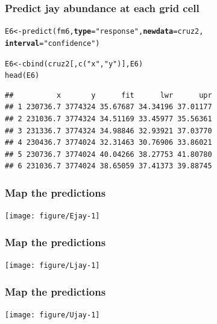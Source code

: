 \documentclass[color=usenames,dvipsnames]{beamer}\usepackage[]{graphicx}\usepackage[]{color}
\makeatletter
\newcommand{\hlstr}[1]{\textcolor[rgb]{0.749,0.012,0.012}{#1}}%
\newcommand{\hlstd}[1]{\textcolor[rgb]{0,0,0}{#1}}%
\newcommand{\hlkwb}[1]{\textcolor[rgb]{0,0.341,0.682}{#1}}%
\newcommand{\hlkwc}[1]{\textcolor[rgb]{0,0,0}{\textbf{#1}}}%
\newcommand{\hlkwd}[1]{\textcolor[rgb]{0.004,0.004,0.506}{#1}}%
\newenvironment{kframe}{%
 \def\at@end@of@kframe{}%
 \ifinner\ifhmode%
  \def\at@end@of@kframe{\end{minipage}}%
  \begin{minipage}{\columnwidth}%
 \fi\fi%
 \def\FrameCommand##1{\hskip\@totalleftmargin \hskip-\fboxsep
 \colorbox{shadecolor}{##1}\hskip-\fboxsep
     \hskip-\linewidth \hskip-\@totalleftmargin \hskip\columnwidth}%
 \MakeFramed {\advance\hsize-\width
   \@totalleftmargin\z@ \linewidth\hsize
   \@setminipage}}%
 {\par\unskip\endMakeFramed%
 \at@end@of@kframe}
\newenvironment{knitrout}{}{} %
\makeatother
\begin{document}
\begin{frame}[fragile]
  \frametitle{Predict jay abundance at each grid cell}
\begin{knitrout}
\color{fgcolor}\begin{kframe}
\begin{alltt}
\hlstd{E6} \hlkwb{<-} \hlkwd{predict}\hlstd{(fm6,} \hlkwc{type}\hlstd{=}\hlstr{"response"}\hlstd{,} \hlkwc{newdata}\hlstd{=cruz2,}
              \hlkwc{interval}\hlstd{=}\hlstr{"confidence"}\hlstd{)}
\end{alltt}
\end{kframe}
\end{knitrout}
\pause
\begin{knitrout}
\color{fgcolor}\begin{kframe}
\begin{alltt}
\hlstd{E6} \hlkwb{<-} \hlkwd{cbind}\hlstd{(cruz2[,}\hlkwd{c}\hlstd{(}\hlstr{"x"}\hlstd{,}\hlstr{"y"}\hlstd{)], E6)}
\hlkwd{head}\hlstd{(E6)}
\end{alltt}
\begin{verbatim}
##          x       y      fit      lwr      upr
## 1 230736.7 3774324 35.67687 34.34196 37.01177
## 2 231036.7 3774324 34.51169 33.45977 35.56361
## 3 231336.7 3774324 34.98846 32.93921 37.03770
## 4 230436.7 3774024 32.31463 30.76906 33.86021
## 5 230736.7 3774024 40.04266 38.27753 41.80780
## 6 231036.7 3774024 38.65059 37.41373 39.88745
\end{verbatim}
\end{kframe}
\end{knitrout}
\end{frame}


\begin{frame}[fragile]
  \frametitle{Map the predictions}
  \scriptsize

\texttt{[image: figure/Ejay-1]}
\end{frame}




\begin{frame}[fragile]
  \frametitle{Map the predictions}
  \scriptsize

\texttt{[image: figure/Ljay-1]}
\end{frame}




\begin{frame}[fragile]
  \frametitle{Map the predictions}
  \scriptsize

\texttt{[image: figure/Ujay-1]}
\end{frame}
\end{document}
